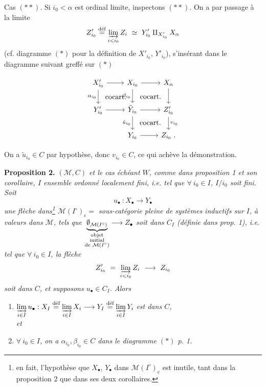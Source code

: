 \documentclass[11pt]{article}
\newcommand{\printedpage}[1]{\marginpar{\footnotesize p.~#1\ifstrequal{#1}{1}{\\[2pt]{[page 1]}}{}}}
\newcommand{\msp}[1]{\ifstrequal{#1}{page 1}{}{\marginpar{\footnotesize [#1]}}}
\newcommand{\defeq}{\overset{\textup{déf}}{=}}
\newcommand{\cocart}{\textup{cocart.}}
\begin{document}
Cas $(**)$. Si $i_0 < \alpha$ est ordinal limite, inspectons $(**)$. On a par passage à la limite
\[
Z'_{i_0} \overset{\text{déf}}{=} \varinjlim_{i<i_0} Z_i \ \simeq\ Y'_{i_0} \amalg_{X'_{i_0}} X_\alpha
\]
(cf. diagramme $(*)$ pour la définition de $X'_{i_0}$, $Y'_{i_0}$), s'insérant dans le diagramme suivant greffé sur $(*)$

\setcounter{footnote}{4}

\printedpage{4}

\msp{page 7}

\[
\begin{tikzcd}
X'_{i_0} \arrow[r] \arrow[d, "\alpha_{i_0}"'] \arrow[dr, phantom, "\cocart"] & X_{i_0} \arrow[r] \arrow[d, "\beta_{i_0}"'] \arrow[dr, phantom, "\cocart"] & X_{\alpha} \arrow[d] \\
Y'_{i_0} \arrow[r] & \tilde{Y}_{i_0} \arrow[r] \arrow[d, "\tilde{u}_{i_0}"'] \arrow[dr, phantom, "\cocart"] & Z'_{i_0} \arrow[d, "v_{i_0}"] \\
& Y_{i_0} \arrow[r] & Z_{i_0}\ .
\end{tikzcd}
\]

On a $\tilde{u}_{i_0} \in C$ par hypothèse, donc $v_{i_0} \in C$, ce qui achève la démonstration.

\textbf{Proposition 2.} \textit{$(\mathcal{M}, C)$ et le cas échéant $W$, comme dans proposition 1 et son corollaire, $I$ ensemble ordonné localement fini, i.e. tel que $\forall\ i_0 \in I$, $I/i_0$ soit fini. Soit}
\[
u_{\bullet}\ : X_{\bullet} \longrightarrow Y_{\bullet}
\]
\textit{une flèche dans\footnote{en fait, l'hypothèse que $X_{\bullet}$, $Y_{\bullet}$ dans $\mathcal{M}(I^{\circ})_{\mathrm{c}}$ est inutile, tant dans la proposition 2 que dans ses deux corollaires.} $\mathcal{M}(I^{\circ})_{\mathrm{c}} =$ sous-catégorie pleine de systèmes inductifs sur $I$, à valeurs dans $\mathcal{M}$, tels que $\underbrace{\emptyset_{\mathcal{M}(I^{\circ})}}_{\substack{\textup{objet}\\ \textup{initial}\\ \textup{de } \mathcal{M}(I^{\circ})}} \longrightarrow Z_{\bullet}$ soit dans $C_I$ (définie dans prop. 1), i.e. tel que $\forall\ i_0 \in I$, la flèche}
\[
Z'_{i_0} \ = \ \varinjlim_{i < i_0} Z_i \ \longrightarrow \ Z_{i_0}
\]
\textit{soit dans $C$, et supposons $u_{\bullet} \in C_I$. Alors}
\begin{enumerate}
\item[a)] $\varinjlim\limits_{i \in I} u_{\bullet} : X_I \defeq \varinjlim\limits_{i \in I} X_i \longrightarrow Y_I \defeq \varinjlim\limits_{i \in I} Y_i$ \textit{est dans $C$,}
\msp{page 8}\\
\textit{et}
\item[b)] \textit{$\forall\ i_0 \in I$, on a $\alpha_{i_0}, \beta_{i_0} \in C$ dans le diagramme $(*)$ p. 1.}
\end{enumerate}
\end{document}
